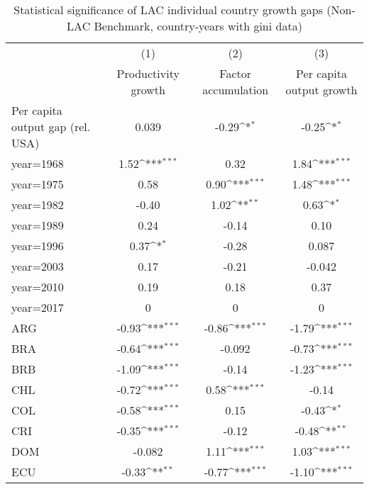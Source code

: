 \begin{table}[htbp]\centering
\def\sym#1{\ifmmode^{#1}\else\(^{#1}\)\fi}
\caption{Statistical significance of LAC individual country growth gaps (Non-LAC Benchmark, country-years with gini data)}
\begin{tabular}{l*{3}{c}}
\toprule
                &\multicolumn{1}{c}{(1)}&\multicolumn{1}{c}{(2)}&\multicolumn{1}{c}{(3)}\\
                &\multicolumn{1}{c}{Productivity growth}&\multicolumn{1}{c}{Factor accumulation}&\multicolumn{1}{c}{Per capita output growth}\\
\midrule
Per capita output gap (rel. USA)&    0.039         &    -0.29\sym{*}  &    -0.25\sym{*}  \\
year=1968       &     1.52\sym{***}&     0.32         &     1.84\sym{***}\\
year=1975       &     0.58         &     0.90\sym{***}&     1.48\sym{***}\\
year=1982       &    -0.40         &     1.02\sym{**} &     0.63\sym{*}  \\
year=1989       &     0.24         &    -0.14         &     0.10         \\
year=1996       &     0.37\sym{*}  &    -0.28         &    0.087         \\
year=2003       &     0.17         &    -0.21         &   -0.042         \\
year=2010       &     0.19         &     0.18         &     0.37         \\
year=2017       &        0         &        0         &        0         \\
ARG             &    -0.93\sym{***}&    -0.86\sym{***}&    -1.79\sym{***}\\
BRA             &    -0.64\sym{***}&   -0.092         &    -0.73\sym{***}\\
BRB             &    -1.09\sym{***}&    -0.14         &    -1.23\sym{***}\\
CHL             &    -0.72\sym{***}&     0.58\sym{***}&    -0.14         \\
COL             &    -0.58\sym{***}&     0.15         &    -0.43\sym{*}  \\
CRI             &    -0.35\sym{***}&    -0.12         &    -0.48\sym{**} \\
DOM             &   -0.082         &     1.11\sym{***}&     1.03\sym{***}\\
ECU             &    -0.33\sym{**} &    -0.77\sym{***}&    -1.10\sym{***}\\

\end{tabular}
\end{table}
